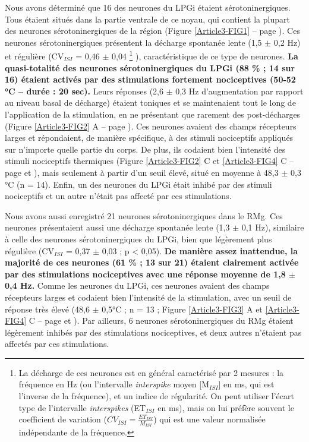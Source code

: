 \documentclass[a4paper,12pt,twoside]{report}
\begin{document}
Nous avons déterminé que 16 des neurones du LPGi étaient sérotoninergiques. Tous étaient situés dans la partie ventrale de ce noyau, qui contient la plupart des neurones sérotoninergiques de la région (Figure \ref{Article3-FIG1} – page \pageref{Article3-FIG1}). Ces neurones sérotoninergiques présentent la décharge spontanée lente (1,5 $\pm$ 0,2 Hz) et régulière (CV$_{ISI}$ = 0,46 $\pm$ 0,04
\footnote{La décharge de ces neurones est en général caractérisé par 2 mesures : la fréquence en Hz (ou l’intervalle \textit{interspike} moyen [M$_{ISI}$] en ms, qui est l’inverse de la fréquence), et un indice de régularité. On peut utiliser l’écart type de l’intervalle \textit{interspikes} (ET$_{ISI}$ en ms), mais on lui préfère souvent le coefficient de variation ($CV_{ISI} = \frac{ET_{ISI}}{M_{ISI}}$) qui est une valeur normalisée indépendante de la fréquence.}
), caractéristique de ce type de neurones. \textbf{La quasi-totalité des neurones sérotoninergiques du LPGi (88 \% ; 14 sur 16) étaient activés par des stimulations fortement nociceptives (50-52 °C – durée : 20 sec).} Leurs réponses (2,6 $\pm$ 0,3 Hz d’augmentation par rapport au niveau basal de décharge) étaient toniques et se maintenaient tout le long de l’application de la stimulation, en ne présentant que rarement des post-décharges (Figure \ref{Article3-FIG2} A – page \pageref{Article3-FIG2}). Ces neurones avaient des champs récepteurs larges et répondaient, de manière spécifique, à des stimuli nociceptifs appliqués sur n’importe quelle partie du corps. De plus, ils codaient bien l’intensité des stimuli nociceptifs thermiques (Figure \ref{Article3-FIG2} C et \ref{Article3-FIG4} C – page \pageref{Article3-FIG2} et \pageref{Article3-FIG4}), mais seulement à partir d’un seuil élevé, situé en moyenne à 48,3 $\pm$ 0,3 °C (n = 14). Enfin, un des neurones du LPGi était inhibé par des stimuli nociceptifs et un autre n’était pas affecté par ces stimulations.

Nous avons aussi enregistré 21 neurones sérotoninergiques dans le RMg. Ces neurones présentaient aussi une décharge spontanée lente (1,3 $\pm$ 0,1 Hz), similaire à celle des neurones sérotoninergiques du LPGi, bien que légèrement plus régulière (CV$_{ISI}$ = 0,37 $\pm$ 0,03 ; p < 0,05). \textbf{De manière assez inattendue, la majorité de ces neurones (61 \% ; 13 sur 21) étaient clairement activée par des stimulations nociceptives avec une réponse moyenne de 1,8 $\pm$ 0,4 Hz.} Comme les neurones du LPGi, ces neurones avaient des champs récepteurs larges et codaient bien l’intensité de la stimulation, avec un seuil de réponse très élevé (48,6 $\pm$ 0,5°C ; n = 13 ; Figure \ref{Article3-FIG3} A et \ref{Article3-FIG4} C – page \pageref{Article3-FIG3} et \pageref{Article3-FIG4}). Par ailleurs, 6 neurones sérotoninergiques du RMg étaient légèrement inhibés par des stimulations nociceptives, et deux autres n’étaient pas affectés par ces stimulations.
\end{document}
